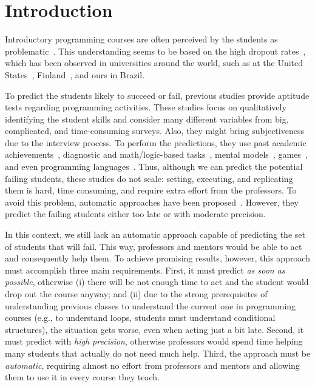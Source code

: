 
\section{Introduction}

Introductory programming courses are often perceived by the students as problematic~\cite{yadin-inroads-acm-11}. This understanding seems to be based on the high dropout rates~\cite{camel-2006, what-works-cacm-2013}, which has been observed in universities around the world, such as at the United States~\cite{bennedsen-sigcse-failure-rates-2007}, Finland~\cite{why-dropout-icer06}, and ours in Brazil.

To predict the students likely to succeed or fail, previous studies provide aptitude tests regarding programming activities. These studies focus on qualitatively identifying the student skills and consider many different variables from big, complicated, and time-consuming surveys. Also, they might bring subjectiveness due to the interview process. To perform the predictions, they use past academic achievements~\cite{hostetler-aptitude-1983, butcher-predictor-high-school-1985}, diagnostic and math/logic-based tasks~\cite{simon-predictors-ace2006, ibm-aptitude-test}, mental models~\cite{camel-2006}, games~\cite{lorenzenC06-mastermind-predictor-sigcse2008}, and even programming languages~\cite{harris-assembly-jcsc2014}. Thus, although we can predict the potential failing students, these studies do not scale: setting, executing, and replicating them is hard, time consuming, and require extra effort from the professors. To avoid this problem, automatic approaches have been proposed~\cite{watson-icalt-2013, emily-icer-2011}. However, they predict the failing students either too late or with moderate precision.

In this context, we still lack an automatic approach capable of predicting the set of students that will fail. This way, professors and mentors would be able to act and consequently help them. To achieve promising results, however, this approach must accomplish three main requirements. First, it must predict \textit{as soon as possible}, otherwise (i) there will be not enough time to act and the student would drop out the course anyway; and (ii) due to the strong prerequisites of understanding previous classes to understand the current one in programming courses (e.g., to understand loops, students must understand conditional structures), the situation gets worse, even when acting just a bit late. Second, it must predict with \textit{high precision}, otherwise professors would spend time helping many students that actually do not need much help. Third, the approach must be \textit{automatic}, requiring almost no effort from professors and mentors and allowing them to use it in every course they teach.

